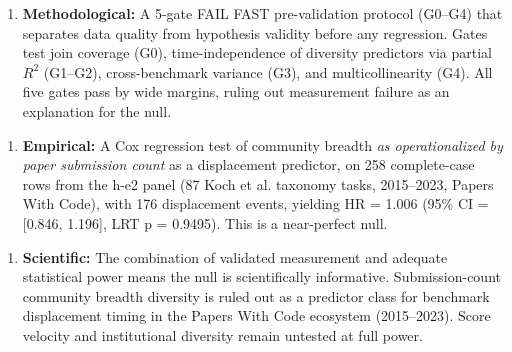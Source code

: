 \begin{enumerate}
\item \textbf{Methodological:} A 5-gate FAIL FAST pre-validation protocol (G0--G4) that separates data quality from hypothesis validity before any regression. Gates test join coverage (G0), time-independence of diversity predictors via partial $R^2$ (G1--G2), cross-benchmark variance (G3), and multicollinearity (G4). All five gates pass by wide margins, ruling out measurement failure as an explanation for the null.
\end{enumerate}

\begin{enumerate}
\item \textbf{Empirical:} A Cox regression test of community breadth \textit{as operationalized by paper submission count} as a displacement predictor, on 258 complete-case rows from the h-e2 panel (87 Koch et al. \cite{koch2021reduced} taxonomy tasks, 2015--2023, Papers With Code), with 176 displacement events, yielding HR = 1.006 (95\% CI = [0.846, 1.196], LRT p = 0.9495). This is a near-perfect null.
\end{enumerate}

\begin{enumerate}
\item \textbf{Scientific:} The combination of validated measurement and adequate statistical power means the null is scientifically informative. Submission-count community breadth diversity is ruled out as a predictor class for benchmark displacement timing in the Papers With Code ecosystem (2015--2023). Score velocity and institutional diversity remain untested at full power.
\end{enumerate}

